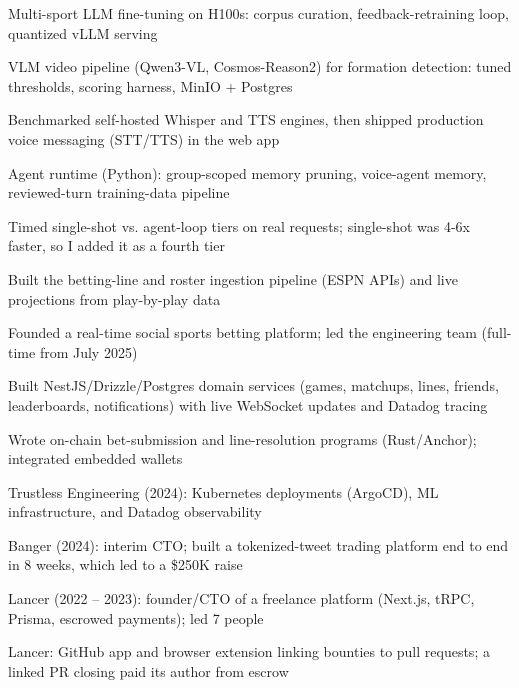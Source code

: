 \documentclass[print]{jack-resume}
\begin{document}
\begin{tightemize}
    \item Multi-sport LLM fine-tuning on H100s: corpus curation, feedback-retraining loop, quantized vLLM serving
    \item VLM video pipeline (Qwen3-VL, Cosmos-Reason2) for formation detection: tuned thresholds, scoring harness, MinIO + Postgres
    \item Benchmarked self-hosted Whisper and TTS engines, then shipped production voice messaging (STT/TTS) in the web app
    \item Agent runtime (Python): group-scoped memory pruning, voice-agent memory, reviewed-turn training-data pipeline
    \item Timed single-shot vs. agent-loop tiers on real requests; single-shot was 4-6x faster, so I added it as a fourth tier
\end{tightemize}
\sectionsep

\begin{tightemize}
    \item Built the betting-line and roster ingestion pipeline (ESPN APIs) and live projections from play-by-play data
    \item Founded a real-time social sports betting platform; led the engineering team (full-time from July 2025)
    \item Built NestJS/Drizzle/Postgres domain services (games, matchups, lines, friends, leaderboards, notifications) with live WebSocket updates and Datadog tracing
    \item Wrote on-chain bet-submission and line-resolution programs (Rust/Anchor); integrated embedded wallets
\end{tightemize}
\sectionsep

\begin{tightemize}
    \item Trustless Engineering (2024): Kubernetes deployments (ArgoCD), ML infrastructure, and Datadog observability
    \item Banger (2024): interim CTO; built a tokenized-tweet trading platform end to end in 8 weeks, which led to a \$250K raise
    \item Lancer (2022 -- 2023): founder/CTO of a freelance platform (Next.js, tRPC, Prisma, escrowed payments); led 7 people
    \item Lancer: GitHub app and browser extension linking bounties to pull requests; a linked PR closing paid its author from escrow
\end{tightemize}
\sectionsep
\end{document}

